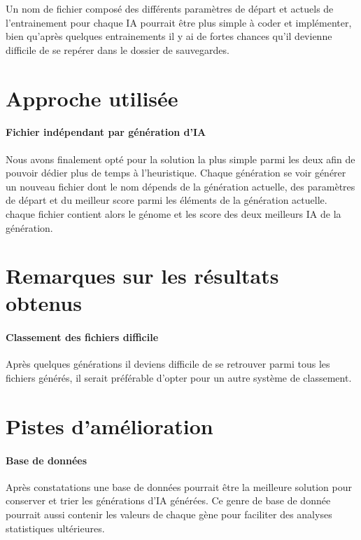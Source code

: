 \documentclass{scrreprt}
\begin{document}
			Un nom de fichier composé des différents paramètres de départ et actuels de l'entrainement pour chaque IA pourrait être plus simple à coder et implémenter, bien qu'après quelques entrainements il y ai de fortes chances qu'il devienne difficile de se repérer dans le dossier de sauvegardes.
			
		\section{Approche utilisée}
			\paragraph{Fichier indépendant par génération d'IA}
			
			Nous avons finalement opté pour la solution la plus simple parmi les deux afin de pouvoir dédier plus de temps à l'heuristique. Chaque génération se voir générer un nouveau fichier dont le nom dépends de la génération actuelle, des paramètres de départ et du meilleur score parmi les éléments de la génération actuelle. chaque fichier contient alors le génome et les score des deux meilleurs IA de la génération.
			
			
		\section{Remarques sur les résultats obtenus}
			\paragraph{Classement des fichiers difficile}
			
			Après quelques générations il deviens difficile de se retrouver parmi tous les fichiers générés, il serait préférable d'opter pour un autre système de classement.
			
		\section{Pistes d'amélioration}
			\paragraph{Base de données}
			
			Après constatations une base de données pourrait être la meilleure solution pour conserver et trier les générations d'IA générées. Ce genre de base de donnée pourrait aussi contenir les valeurs de chaque gène pour faciliter des analyses statistiques ultérieures.
			
\end{document}
